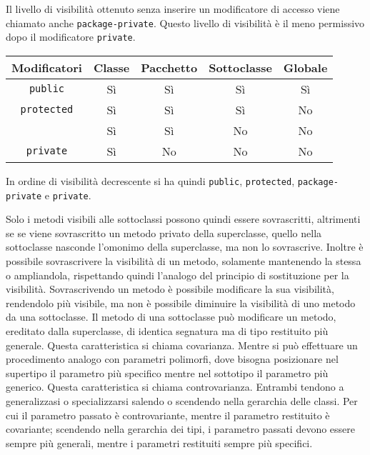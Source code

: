 \documentclass{article}
\numberwithin{equation}{subsection}
\begin{document}
Il livello di visibilità ottenuto senza inserire un modificatore di accesso viene chiamato anche \verb|package-private|. Questo livello di visibilità è il meno permissivo 
dopo il modificatore \verb|private|. 

\begin{center}
    \begin{tabular}{|c||c|c|c|c|}
        \hline
        Modificatori & Classe & Pacchetto & Sottoclasse & Globale\\
        \hline\hline
        \verb|public| & Sì & Sì & Sì & Sì \\
        \hline
        \verb|protected| & Sì & Sì & Sì & No\\
        \hline
        & Sì & Sì & No & No\\
        \hline
        \verb|private| & Sì & No & No & No \\
        \hline        
    \end{tabular}
\end{center}

In ordine di visibilità decrescente si ha quindi \verb|public|, \verb|protected|, \verb|package-private| e \verb|private|. 


Solo i metodi visibili alle sottoclassi possono quindi essere sovrascritti, altrimenti se se viene sovrascritto un metodo privato della superclasse, quello nella sottoclasse nasconde 
l'omonimo della superclasse, ma non lo sovrascrive. Inoltre è possibile sovrascrivere la visibilità di un metodo, solamente mantenendo la stessa o ampliandola, rispettando quindi 
l'analogo del principio di sostituzione per la visibilità. 
Sovrascrivendo un metodo è possibile modificare la sua visibilità, rendendolo più visibile, ma non è possibile diminuire la visibilità di uno metodo da una sottoclasse. 
Il metodo di una sottoclasse può modificare un metodo, ereditato dalla superclasse, di identica segnatura ma di tipo restituito più generale. Questa caratteristica si chiama 
covarianza. 
Mentre si può effettuare un procedimento analogo con parametri polimorfi, dove bisogna posizionare nel supertipo il parametro più specifico mentre nel sottotipo il parametro 
più generico. Questa caratteristica si chiama controvarianza. 
Entrambi tendono a generalizzasi o specializzarsi salendo o scendendo nella gerarchia delle classi. 
Per cui il parametro passato è controvariante, mentre il parametro restituito è covariante; scendendo nella gerarchia dei tipi, i parametro passati devono essere sempre 
più generali, mentre i parametri restituiti sempre più specifici. 
\end{document}
